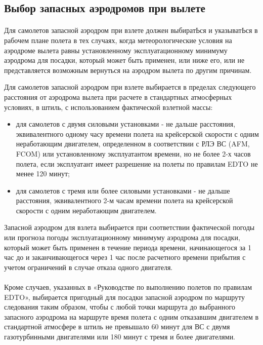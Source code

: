 \subsection{Выбор запасных аэродромов при вылете}

\paragraph{} \label{par:altrule2} Для самолетов запасной аэродром при взлете должен выбиратЬся и указыватЬся в рабочем плане полета в тех случаях, когда метеорологические условия на аэродроме вылета равны установленному эксплуатационному минимуму аэродрома для посадки, который может быть применен, или ниже его, или не представляется возможным вернуться на аэродром вылета по другим причинам. 

Для самолетов запасной аэродром при взлете выбирается в пределах следующего расстояния от аэродрома вылета при расчете в стандартных атмосферных условиях, в штиль, с использованием фактической взлетной массы:
\begin{itemize}
    \item для самолетов с двумя силовыми установками - не дальше расстояния, эквивалентного одному часу времени полета на крейсерской скорости с одним неработающим двигателем, определенном в соответствии с РЛЭ ВС (AFM, FCOM) или установленному эксплуатантом времени, но не более 2-х часов полета, если эксплуатант имеет разрешение на полеты по правилам EDTO не менее 120 минут;
    \item для самолетов с тремя или более силовыми установками - не дальше расстояния, эквивалентного 2-м часам времени полета на крейсерской скорости с одним неработающим двигателем.
\end{itemize} 

Запасной аэродром для взлета выбирается при соответствии фактической погоды или прогноза погоды эксплуатационному минимуму аэродрома для посадки, который может быть применен в течение периода времени, начинающегося за 1 час до и заканчивающегося через 1 час после расчетного времени прибытия с учетом ограничений в случае отказа одного двигателя. 

\paragraph{} \label{par:altrule} Кроме случаев, указанных в «Руководстве по выполнению полетов по правилам EDTO», выбирается пригодный для посадки запасной аэродром по маршруту следования таким образом, чтобы с любой точки маршрута до выбранного запасного аэродрома на маршруте время полета с одним отказавшим двигателем в стандартной атмосфере в штиль не превышало 60 минут для ВС с двумя газотурбинными двигателями или 180 минут с тремя и более двигателями.

